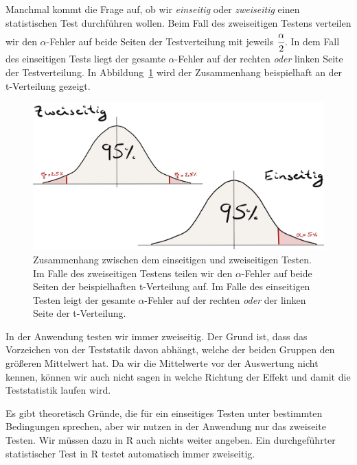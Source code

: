 \documentclass[
  letterpaper,
  DIV=11,
  oneside]{scrreport}
\begin{document}
Manchmal kommt die Frage auf, ob wir \emph{einseitig} oder
\emph{zweiseitig} einen statistischen Test durchführen wollen. Beim Fall
des zweiseitigen Testens verteilen wir den \(\alpha\)-Fehler auf beide
Seiten der Testverteilung mit jeweils \(\cfrac{\alpha}{2}\). In dem Fall
des einseitigen Tests liegt der gesamte \(\alpha\)-Fehler auf der
rechten \emph{oder} linken Seite der Testverteilung. In
Abbildung~\ref{fig-teststatistik-02} wird der Zusammenhang beispielhaft
an der t-Verteilung gezeigt.

\begin{figure}

{\centering \includegraphics{./images/t-verteilung_02.png}

}

\caption{\label{fig-teststatistik-02}Zusammenhang zwischen dem
einseitigen und zweiseitigen Testen. Im Falle des zweiseitigen Testens
teilen wir den \(\alpha\)-Fehler auf beide Seiten der beispielhaften
t-Verteilung auf. Im Falle des einseitigen Testen leigt der gesamte
\(\alpha\)-Fehler auf der rechten \emph{oder} der linken Seite der
t-Verteilung.}

\end{figure}

{}

In der Anwendung testen wir immer zweiseitig. Der Grund ist, dass das
Vorzeichen von der Teststatik davon abhängt, welche der beiden Gruppen
den größeren Mittelwert hat. Da wir die Mittelwerte vor der Auswertung
nicht kennen, können wir auch nicht sagen in welche Richtung der Effekt
und damit die Teststatistik laufen wird.

Es gibt theoretisch Gründe, die für ein einseitiges Testen unter
bestimmten Bedingungen sprechen, aber wir nutzen in der Anwendung nur
das zweiseite Testen. Wir müssen dazu in R auch nichts weiter angeben.
Ein durchgeführter statistischer Test in R testet automatisch immer
zweiseitig.
\end{document}
